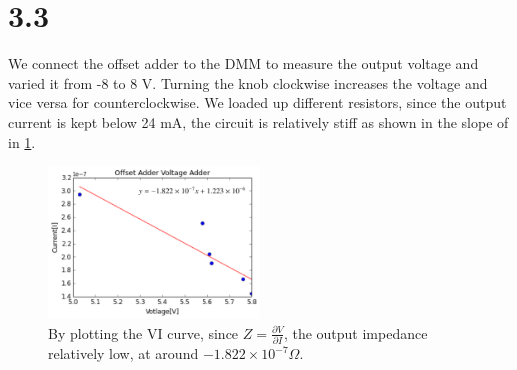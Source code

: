 \documentclass[authoryear, 12pt,5p, times]{elsarticle}
\begin{document}
\section*{3.3}
We connect the offset adder to the DMM to measure the output voltage and varied it from -8 to 8 V. Turning the knob clockwise increases the voltage and vice versa for counterclockwise. We loaded up different resistors, since the output current is kept below 24 mA, the circuit is relatively stiff as shown in the slope of in \ref{3_3}. 
\begin{figure}[h!]
\center
\includegraphics[width=0.5\textwidth]{figure/3_3}
\caption{By plotting the VI curve, since $Z=\frac{\partial V}{\partial I}$, the output  impedance relatively low, at around $-1.822\times10^{-7} \Omega$.}
\label{3_3}
\end{figure}
\end{document}

